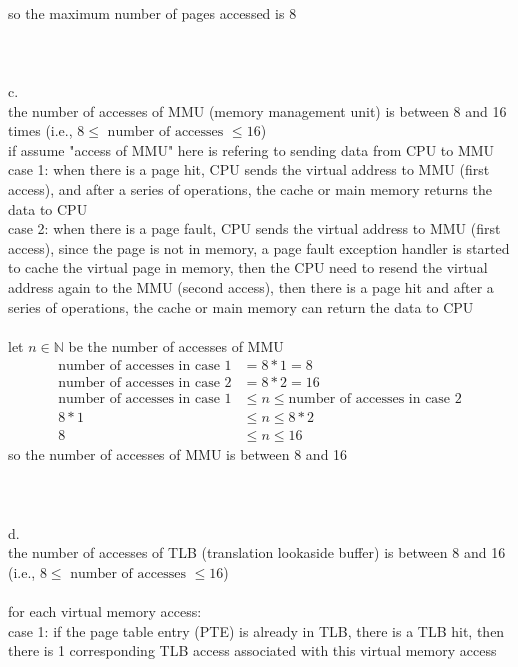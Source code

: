 \documentclass[12pt, border = 4pt, multi]{article} %
\begin{document}
\\
so the maximum number of pages accessed is 8\\
\\
\\
\\
c.\\
the number of accesses of MMU (memory management unit) is between 8 and 16 times (i.e., $8 \leq \text{ number of accesses }\leq 16$)\\
if assume "access of MMU" here is refering to sending data from CPU to MMU\\
case 1: when there is a page hit, CPU sends the virtual address to MMU (first access), and after a series of operations, the cache or main memory returns the data to CPU\\
case 2: when there is a page fault, CPU sends the virtual address to MMU (first access), since the page is not in memory, a page fault exception handler is started to cache the virtual page in memory, then the CPU need to resend the virtual address again to the MMU (second access), then there is a page hit and after a series of operations, the cache or main memory can return the data to CPU\\
\\
let $n \in \mathbb{N}$ be the number of accesses of MMU
\begin{align*}
\text{number of accesses in case 1} &= 8 * 1 = 8\\
\text{number of accesses in case 2} &= 8 * 2 = 16\\
\text{number of accesses in case 1} &\leq n \leq \text{number of accesses in case 2}\\
8 * 1 &\leq n \leq 8 * 2\\
8 &\leq n \leq 16
\end{align*}
so the number of accesses of MMU is between 8 and 16
\\
\\
\\
\\
d.\\
the number of accesses of TLB (translation lookaside buffer) is between 8 and 16 (i.e., $8 \leq \text{ number of accesses }\leq 16$)\\
\\
for each virtual memory access:\\
case 1: if the page table entry (PTE) is already in TLB, there is a TLB hit, then there is 1 corresponding TLB access associated with this virtual memory access\\
\end{document}
